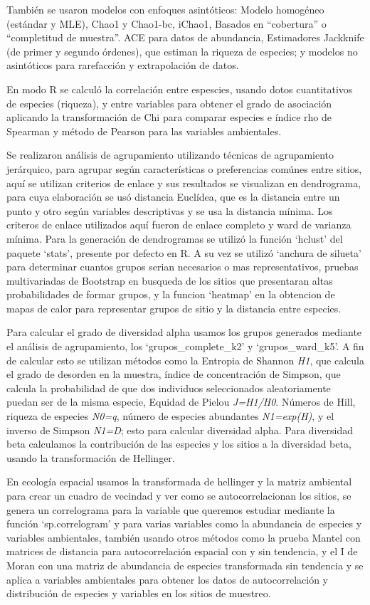 \documentclass[11pt,]{article}
\begin{document}
También se usaron modelos con enfoques asintóticos: Modelo homogéneo
(estándar y MLE), Chao1 y Chao1-bc, iChao1, Basados en ``cobertura'' o
``completitud de muestra''. ACE para datos de abundancia, Estimadores
Jackknife (de primer y segundo órdenes), que estiman la riqueza de
especies; y modelos no asintóticos para rarefacción y extrapolación de
datos.

En modo R se calculó la correlación entre espescies, usando dotos
cuantitativos de especies (riqueza), y entre variables para obtener el
grado de asociación aplicando la transformación de Chi para comparar
especies e índice rho de Spearman y método de Pearson para las variables
ambientales.

Se realizaron análisis de agrupamiento utilizando técnicas de
agrupamiento jerárquico, para agrupar según características o
preferencias comúnes entre sitios, aquí se utilizan criterios de enlace
y sus resultados se visualizan en dendrograma, para cuya elaboración se
usó distancia Euclídea, que es la distancia entre un punto y otro según
variables descriptivas y se usa la distancia mínima. Los criteros de
enlace utilizados aquí fueron de enlace completo y ward de varianza
mínima. Para la generación de dendrogramas se utilizó la función
`hclust' del paquete `stats', presente por defecto en R. A su vez se
utilizó `anchura de silueta' para determinar cuantos grupos serian
necesarios o mas representativos, pruebas multivariadas de Bootstrap en
busqueda de los sitios que presentaran altas probabilidades de formar
grupos, y la funcion `heatmap' en la obtencion de mapas de calor para
representar grupos de sitio y la distancia entre especies.

Para calcular el grado de diversidad alpha usamos los grupos generados
mediante el análisis de agrupamiento, los `grupos\_complete\_k2' y
`grupos\_ward\_k5'. A fin de calcular esto se utilizan métodos como la
Entropia de Shannon \emph{H1}, que calcula el grado de desorden en la
muestra, índice de concentración de Simpson, que calcula la probabilidad
de que dos individuos seleccionados aleatoriamente puedan ser de la
misma especie, Equidad de Pielou \emph{J=H1/H0}. Números de Hill,
riqueza de especies \emph{N0=q}, número de especies abundantes
\emph{N1=exp(H)}, y el inverso de Simpson \emph{N1=D}; esto para
calcular diversidad alpha. Para diversidad beta calculamos la
contribución de las especies y los sitios a la diversidad beta, usando
la transformación de Hellinger.

En ecología espacial usamos la transformada de hellinger y la matriz
ambiental para crear un cuadro de vecindad y ver como se
autocorrelacionan los sitios, se genera un correlograma para la variable
que queremos estudiar mediante la función `sp.correlogram' y para varias
variables como la abundancia de especies y variables ambientales,
también usando otros métodos como la prueba Mantel con matrices de
distancia para autocorrelación espacial con y sin tendencia, y el I de
Moran con una matriz de abundancia de especies transformada sin
tendencia y se aplica a variables ambientales para obtener los datos de
autocorrelación y distribución de especies y variables en los sitios de
muestreo.
\end{document}
